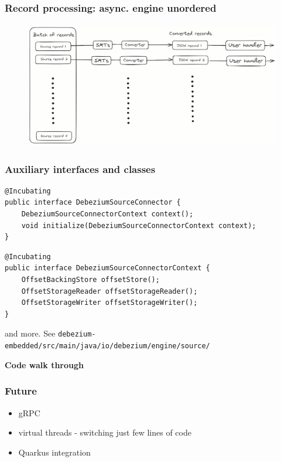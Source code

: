 \documentclass[10pt,utf8]{beamer}
\begin{document}
\begin{frame}
    \frametitle{Record processing:  async.  engine unordered}
    \begin{figure}
        \centering
        \includegraphics[height=5.5cm]{./img/parallel_processing_async.eps}
    \end{figure}
\end{frame}

\begin{frame}[fragile]
    \frametitle{Auxiliary interfaces and classes}
    \begin{lstlisting}[style=java]
@Incubating
public interface DebeziumSourceConnector {
    DebeziumSourceConnectorContext context();
    void initialize(DebeziumSourceConnectorContext context);
}
    \end{lstlisting}
    
    \begin{lstlisting}[style=java]
@Incubating
public interface DebeziumSourceConnectorContext {
    OffsetBackingStore offsetStore();
    OffsetStorageReader offsetStorageReader();
    OffsetStorageWriter offsetStorageWriter();
}
    \end{lstlisting}
    and more. See \texttt{debezium-embedded/src/main/java/io/debezium/engine/source/}
\end{frame}

\begin{frame}
    \centering
    \huge{\textbf{Code walk through}}
\end{frame}

\begin{frame}
    \frametitle{Future}
    \begin{itemize}
        \item gRPC
        \item virtual threads  - switching just few lines of code
        \item Quarkus integration
    \end{itemize}
\end{frame}
\end{document}
